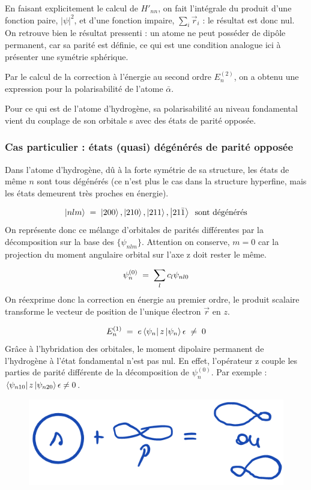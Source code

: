 En faisant explicitement le calcul de $H'_{nn}$, on fait l'intégrale du produit d'une fonction paire, $|\psi|^2$, et d'une fonction impaire, $\sum_i \vec{r}_i$ : le résultat est donc nul. On retrouve bien le résultat pressenti : un atome ne peut posséder de dipôle permanent, car sa parité est définie, ce qui est une condition analogue ici à présenter une symétrie sphérique.

Par le calcul de la correction à l'énergie au second ordre $E_n^{(2)}$, on a obtenu une expression pour la polarisabilité de l'atome $\bar{\alpha}$.

Pour ce qui est de l'atome d'hydrogène, sa polarisabilité au niveau fondamental vient du couplage de son orbitale s avec des états de parité opposée.



\subsubsection{Cas particulier : états (quasi) dégénérés de parité opposée}

Dans l'atome d'hydrogène, dû à la forte symétrie de sa structure, les états de même $n$ sont tous dégénérés (ce n'est plus le cas dans la structure hyperfine, mais les états demeurent très proches en énergie).

\[
    \ket{nlm}\; = \; \ket{200},\ket{210},\ket{211},\ket{21\bar{1}}\;\;\text{sont dégénérés}
\]
On représente donc ce mélange d'orbitales de parités différentes par la décomposition sur la base des $\{\psi_{nlm}\}$. Attention on conserve, $m = 0$ car la projection du moment angulaire orbital sur l'axe z doit rester le même. %

\[
    \psi_n^{(0)} \; = \; \sum_l c_l \psi_{nl0}
\]
On réexprime donc la correction en énergie au premier ordre, le produit scalaire transforme le vecteur de position de l'unique électron $\vec{r}$ en $z$.

\[
    E_n^{(1)} \; = \; e\bra{\psi_n}z\ket{\psi_n}\epsilon \;\neq \; 0
\]
Grâce à l'hybridation des orbitales, le moment dipolaire permanent de l'hydrogène à l'état fondamental n'est pas nul. En effet, l'opérateur z couple les parties de parité différente de la décomposition de $\psi_n^{(0)}$. Par exemple : $\bra{\psi_{n10}}z\ket{\psi_{n20}}\epsilon \neq 0$.\\

\begin{figure}[H]
    \centering
    \includegraphics[scale=0.5]{Images2/hybridation.png}
\end{figure}

